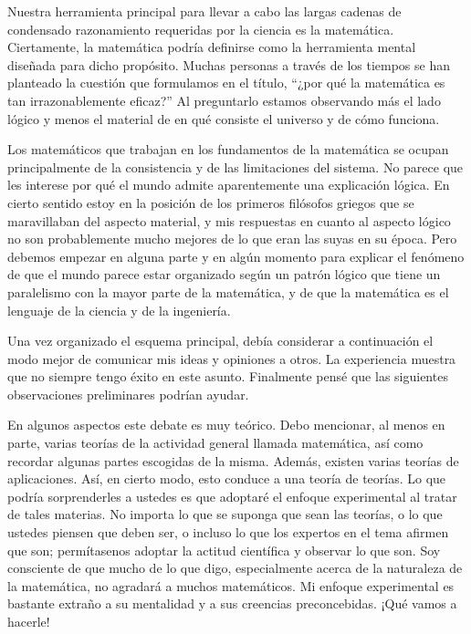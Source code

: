 \documentclass[a4paper, 12pt]{article}
\begin{document}
 

Nuestra herramienta principal para llevar a cabo las largas cadenas de condensado razonamiento requeridas por la ciencia es la matemática. Ciertamente, la matemática podría definirse como la herramienta mental diseñada para dicho propósito. Muchas personas a través de los tiempos se han planteado la cuestión que formulamos en el título, ``¿por qué la matemática es tan irrazonablemente eficaz?'' Al preguntarlo estamos observando más el lado lógico y menos el material de en qué consiste el universo y de cómo funciona.

 

Los matemáticos que trabajan en los fundamentos de la matemática se ocupan principalmente de la consistencia y de las limitaciones del sistema. No parece que les interese por qué el mundo admite aparentemente una explicación lógica. En cierto sentido estoy en la posición de los primeros filósofos griegos que se maravillaban del aspecto material, y mis respuestas en cuanto al aspecto lógico no son probablemente mucho mejores de lo que eran las suyas en su época. Pero debemos empezar en alguna parte y en algún momento para explicar el fenómeno de que el mundo parece estar organizado según un patrón lógico que tiene un paralelismo con la mayor parte de la matemática, y de que la matemática es el lenguaje de la ciencia y de la ingeniería.

 

Una vez organizado el esquema principal, debía considerar a continuación el modo mejor de comunicar mis ideas y opiniones a otros. La experiencia muestra que no siempre tengo éxito en este asunto. Finalmente pensé que las siguientes observaciones preliminares podrían ayudar.

 

En algunos aspectos este debate es muy teórico. Debo mencionar, al menos en parte, varias teorías de la actividad general llamada matemática, así como recordar algunas partes escogidas de la misma. Además, existen varias teorías de aplicaciones. Así, en cierto modo, esto conduce a una teoría de teorías. Lo que podría sorprenderles a ustedes es que adoptaré el enfoque experimental al tratar de tales materias. No importa lo que se suponga que sean las teorías, o lo que ustedes piensen que deben ser, o incluso lo que los expertos en el tema afirmen que son; permítasenos adoptar la actitud científica y observar lo que son. Soy consciente de que mucho de lo que digo, especialmente acerca de la naturaleza de la matemática, no agradará a muchos matemáticos. Mi enfoque experimental es bastante extraño a su mentalidad y a sus creencias preconcebidas. ¡Qué vamos a hacerle!
\end{document}
